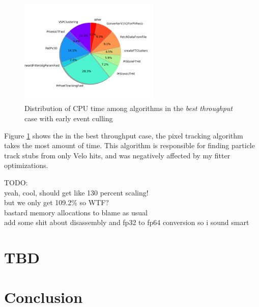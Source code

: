 \documentclass[12pt]{article}
\begin{document}
\begin{figure}[H]
	\begin{center}
		\includegraphics[width=0.6\textwidth]{algo_usage_original_bestthru}
	\end{center}
	\caption{Distribution of CPU time among algorithms in the \textit{best throughput} case with early event culling}
	\label{fig_algo_usage_original_bestthru}
\end{figure}


Figure \ref{fig_algo_usage_original_bestthru} shows the in the best throughput case, the pixel tracking algorithm takes the most amount of time. This algorithm is responsible for finding particle track stubs from only Velo hits, and was negatively affected by my fitter optimizations. 


\vspace{1pc}

TODO:\\
yeah, cool, should get like 130 percent scaling!\\
but we only get 109.2\% so WTF? \\
bastard memory allocations to blame as usual \\
add some shit about disassembly and fp32 to fp64 conversion so i sound smart




\section{TBD}

\section{Conclusion}
\end{document}
